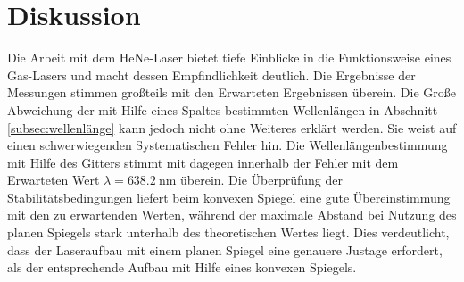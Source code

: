 \section{Diskussion}
\label{sec:diskussion}
Die Arbeit mit dem HeNe-Laser bietet tiefe Einblicke in die Funktionsweise
eines Gas-Lasers und macht dessen Empfindlichkeit deutlich.
Die Ergebnisse der Messungen stimmen großteils mit den Erwarteten Ergebnissen
überein.
Die Große Abweichung der mit Hilfe eines Spaltes bestimmten Wellenlängen
in Abschnitt \ref{subsec:wellenlänge} kann jedoch nicht ohne Weiteres
erklärt werden. Sie weist auf einen schwerwiegenden Systematischen Fehler hin.
Die Wellenlängenbestimmung mit Hilfe des Gitters stimmt mit
 dagegen innerhalb der Fehler mit
dem Erwarteten Wert $\lambda = \SI{638.2}{\nano\meter}$ überein.
Die Überprüfung der Stabilitätsbedingungen liefert beim konvexen Spiegel
eine gute Übereinstimmung mit den zu erwartenden Werten, während der maximale
Abstand bei Nutzung des planen Spiegels stark unterhalb des theoretischen
Wertes liegt. Dies verdeutlicht, dass der Laseraufbau mit einem planen Spiegel
eine genauere Justage erfordert, als der entsprechende Aufbau
mit Hilfe eines konvexen Spiegels.
